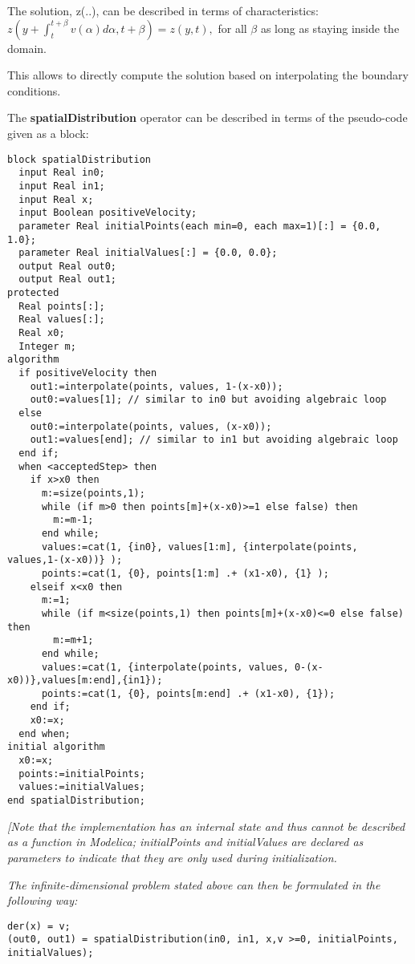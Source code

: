 The solution, z(..), can be described in terms of characteristics:\\
$z(y+\int_t^{t+\beta}v(\alpha)d\alpha,t+\beta)=z(y,t),$ for all $\beta$ as long as staying inside the domain.

This allows to directly compute the solution based on interpolating the
boundary conditions.

The \textbf{spatialDistribution} operator can be described in terms of
the pseudo-code given as a block:
\begin{lstlisting}[language=modelica]
block spatialDistribution
  input Real in0;
  input Real in1;
  input Real x;
  input Boolean positiveVelocity;
  parameter Real initialPoints(each min=0, each max=1)[:] = {0.0, 1.0};
  parameter Real initialValues[:] = {0.0, 0.0};
  output Real out0;
  output Real out1;
protected
  Real points[:];
  Real values[:];
  Real x0;
  Integer m;
algorithm
  if positiveVelocity then
    out1:=interpolate(points, values, 1-(x-x0));
    out0:=values[1]; // similar to in0 but avoiding algebraic loop
  else
    out0:=interpolate(points, values, (x-x0));
    out1:=values[end]; // similar to in1 but avoiding algebraic loop
  end if;
  when <acceptedStep> then
    if x>x0 then
      m:=size(points,1);
      while (if m>0 then points[m]+(x-x0)>=1 else false) then
        m:=m-1;
      end while;
      values:=cat(1, {in0}, values[1:m], {interpolate(points, values,1-(x-x0))} );
      points:=cat(1, {0}, points[1:m] .+ (x1-x0), {1} );
    elseif x<x0 then
      m:=1;
      while (if m<size(points,1) then points[m]+(x-x0)<=0 else false) then
        m:=m+1;
      end while;
      values:=cat(1, {interpolate(points, values, 0-(x-x0))},values[m:end],{in1});
      points:=cat(1, {0}, points[m:end] .+ (x1-x0), {1});
    end if;
    x0:=x;
  end when;
initial algorithm
  x0:=x;
  points:=initialPoints;
  values:=initialValues;
end spatialDistribution;
\end{lstlisting}

\emph{{[}Note that the implementation has an internal state and thus
cannot be described as a function in Modelica; initialPoints and
initialValues are declared as parameters to indicate that they are only
used during initialization. }

\emph{The infinite-dimensional problem stated above can then be
formulated in the following way:}

\begin{lstlisting}[language=modelica]
der(x) = v;
(out0, out1) = spatialDistribution(in0, in1, x,v >=0, initialPoints, initialValues);
\end{lstlisting}


